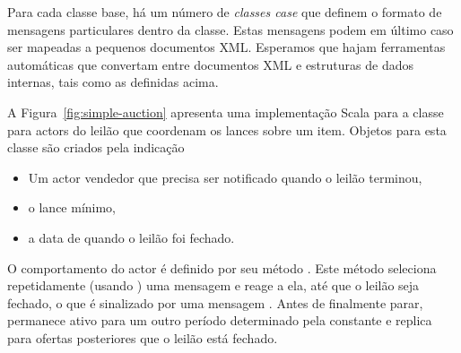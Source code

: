 Para cada classe base, há um número de {\em classes case} que definem
o formato de mensagens particulares dentro da classe. Estas mensagens
podem em último caso ser mapeadas a pequenos documentos XML. Esperamos
que hajam ferramentas automáticas que convertam entre documentos XML e 
estruturas de dados internas, tais como as definidas acima.
%

A Figura~\ref{fig:simple-auction} apresenta uma implementação Scala para a classe
 para actors do leilão que coordenam os lances sobre um item. Objetos
para esta classe são criados pela indicação
\begin{itemize}
\item Um actor vendedor que precisa ser notificado quando o leilão terminou,
\item o lance mínimo,
\item a data de quando o leilão foi fechado.
\end{itemize}  
O comportamento do actor é definido por seu método . Este método seleciona
repetidamente (usando ) uma mensagem e reage a ela, até que o 
leilão seja fechado, o que é sinalizado por uma mensagem . Antes de 
finalmente parar, permanece ativo para um outro período determinado pela constante 
 e replica para ofertas posteriores que o leilão está fechado.    

